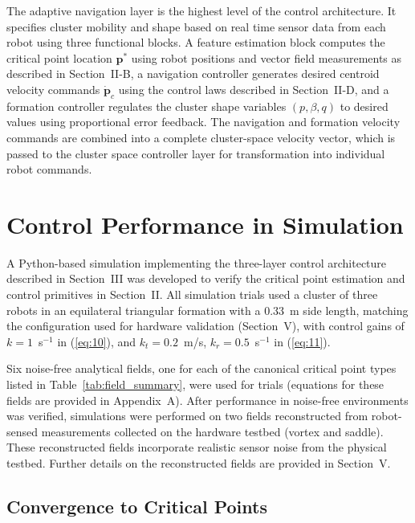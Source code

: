 \documentclass[lettersize,journal]{IEEEtran}
\begin{document}
The adaptive navigation layer is the highest level of the control architecture. It specifies cluster mobility and shape based on real time sensor data from each robot using three functional blocks. A feature estimation block computes the critical point location $\mathbf{p}^*$ using robot positions and vector field measurements as described in Section~II-B, a navigation controller generates desired centroid velocity commands $\dot{\mathbf{p}}_c$ using the control laws described in Section~II-D, and a formation controller regulates the cluster shape variables $(p, \beta, q)$ to desired values using proportional error feedback. The navigation and formation velocity commands are combined into a complete cluster-space velocity vector, which is passed to the cluster space controller layer for transformation into individual robot commands.


\section{Control Performance in Simulation}

A Python-based simulation implementing the three-layer control architecture described in Section~III was developed to verify the critical point estimation and control primitives in Section~II. All simulation trials used a cluster of three robots in an equilateral triangular formation with a 0.33~m side length, matching the configuration used for hardware validation (Section~V), with control gains of $k = 1$~s$^{-1}$ in (\ref{eq:10}), and $k_t = 0.2$~m/s, $k_r = 0.5$~s$^{-1}$ in (\ref{eq:11}).

Six noise-free analytical fields, one for each of the canonical critical point types listed in Table~\ref{tab:field_summary}, were used for trials (equations for these fields are provided in Appendix~A). After performance in noise-free environments was verified, simulations were performed on two fields reconstructed from robot-sensed measurements collected on the hardware testbed (vortex and saddle). These reconstructed fields incorporate realistic sensor noise from the physical testbed. Further details on the reconstructed fields are provided in Section~V.

\subsection{Convergence to Critical Points}
\end{document}
